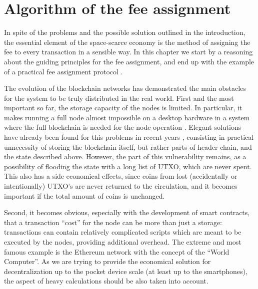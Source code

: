 \documentclass[]{llncs}   %
\newcommand{\authnote}[2]{\marginpar{\parbox{\marginparwidth}{\tiny %
  \textsf{#1 {\textcolor{blue}{notes: #2}}}}}%
  \textcolor{blue}{\textbf{\dag}}}
\newcommand{\authnote}[2]{
  \textsf{#1\textcolor{blue}{ #2}}}
\newcommand{\authnote}[2]{}
\newcommand{\knote}[1]{{\authnote{\textcolor{green}{Alex notes:}}{#1}}}
\newcommand{\vk}[1]{{\authnote{\textcolor{red}{V:}}{#1}}}
\begin{document}

\section{Algorithm of the fee assignment}
In spite of the problems and the possible solution outlined in the introduction,
the essential element of the space-scarce economy is the method of assigning the
fee to every transaction \vk{or block?} in a sensible way. In this chapter we
start by a reasoning about the guiding principles for the fee assignment, and
end up with the example of a practical fee assignment protocol \knote{rule?}.

The evolution of the blockchain networks has demonstrated the main obstacles for
the system to be truly distributed in the real world. First and the most
important so far, the storage capacity of the nodes is limited. In particular, it
makes running a full node almost impossible on a desktop hardware in a system 
where the full blockchain is needed for the node operation \vk{more details}.
Elegant solutions have already been found for this problems in recent years
\vk{citations}, consisting in practical unnecessity of storing the blockchain
itself, but rather parts of header chain, and the state described above.
However, the part of this vulnerability remains, as a possibility of flooding
the state with a long list of UTXO, which are never spent. This also has a side
economical effects, since coins from lost (accidentally or intentionally) UTXO's
are never returned to the circulation, and it becomes important if the total
amount of coins is unchanged.

Second, it becomes obvious, especially with the development of smart contracts,
that a transaction ``cost'' for the node can be more than just a storage:
transactions can contain relatively complicated scripts which are meant to be
executed by the nodes, providing additional overhead. The extreme and most
famous example is the Ethereum network with the concept of the ``World
Computer''. As we are trying to provide the economical solution for
decentralization up to the pocket device scale (at least up to the smartphones),
the aspect of heavy calculations should be also taken into account.
\end{document}
